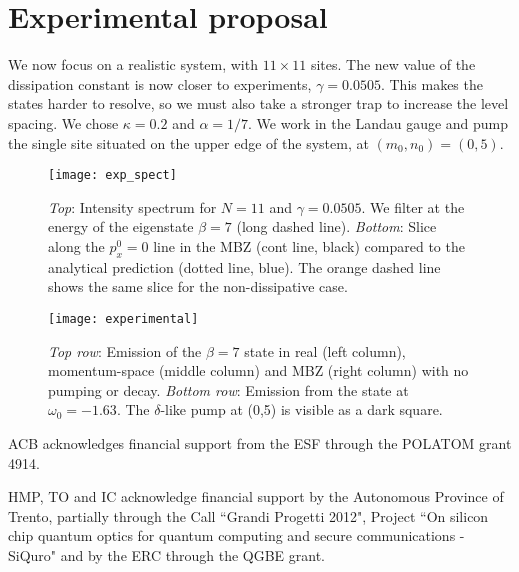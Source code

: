 \documentclass[twocolumn, 10pt, aps, superscriptaddress, floatfix, showpacs, prb, citeautoscript]{revtex4-1}
\begin{document}


\section{Experimental proposal}
\label{sec:experiment}

We now focus on a realistic system, with $11 \times 11$ sites. The new
value of the dissipation constant is now closer to experiments,
$\gamma = 0.0505$. This makes the states harder to resolve, so we must
also take a stronger trap to increase the level spacing. We chose
$\kappa = 0.2$ and $\alpha = 1/7$. We work in the Landau gauge and
pump the single site situated on the upper edge of the system, at
$(m_0,n_0)= (0,5)$.

\begin{figure}[htb]
  \centering
  \texttt{[image: exp\_spect]}
  \caption{\emph{Top}: Intensity spectrum for $N=11$ and
    $\gamma = 0.0505$. We filter at the energy of the eigenstate
    $\beta=7$ (long dashed line).
    \emph{Bottom}: Slice along the
    $p_x^0 = 0$ line in the MBZ (cont line, black) compared to the
    analytical prediction (dotted line, blue). The orange dashed line
    shows the same slice for the non-dissipative case.}
  \label{fig:exp_spectrum}
\end{figure}


\begin{figure}[htb]
  \centering
  \texttt{[image: experimental]}
  \caption{\emph{Top row}: Emission of the $\beta=7$ state in real
    (left column), momentum-space (middle column) and MBZ (right
    column) with no pumping or decay.
    \emph{Bottom row}: Emission from the state at $\omega_0 = -1.63$.
    The $\delta$-like pump at (0,5) is visible as a dark square.}
  \label{fig:exp_states}
\end{figure}




\acknowledgments

ACB acknowledges financial support from the ESF through the POLATOM grant 4914.

HMP, TO and IC acknowledge financial support by the Autonomous Province of Trento, partially through the Call ``Grandi Progetti 2012", Project ``On silicon chip quantum optics for quantum computing and secure communications - SiQuro" and by the ERC through the QGBE grant.



\end{document}
